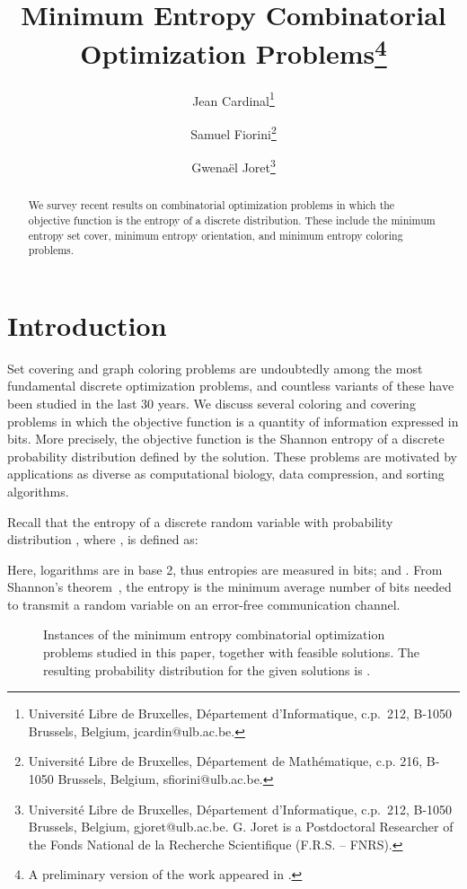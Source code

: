 \documentclass[10pt,a4paper]{article}
\title{Minimum Entropy Combinatorial Optimization Problems\footnote{
A preliminary version of the work appeared in \cite{CiE}.
}}
\author{
Jean Cardinal\thanks{Universit\'e Libre de Bruxelles, D\'epartement d'Informatique, c.p.~212, B-1050 Brussels, Belgium, jcardin@ulb.ac.be.}
 \and 
Samuel Fiorini\thanks{Universit\'e Libre de Bruxelles, D\'epartement de Math\'ematique, c.p. 216,  B-1050 Brussels, Belgium,  sfiorini@ulb.ac.be.}
\and 
Gwena\"el Joret\thanks{Universit\'e Libre de Bruxelles, D\'epartement d'Informatique, c.p.~212,  B-1050 Brussels, Belgium, gjoret@ulb.ac.be. G. Joret is a Postdoctoral Researcher of the Fonds National de la Recherche Scientifique (F.R.S. -- FNRS).}
}
\date{}
\begin{document}
\maketitle
\sloppy

\begin{abstract}
We survey recent results on combinatorial optimization problems in which the objective function is the entropy of a discrete distribution.
These include the minimum entropy set cover, minimum entropy orientation, and minimum entropy coloring problems. 
\end{abstract}

\section{Introduction}

Set covering and graph coloring problems are undoubtedly among the most fundamental discrete optimization problems, and countless variants of these have been studied in the last 30 years. We discuss several coloring and covering problems in which the objective function is a quantity of information expressed in bits. More precisely, the objective function is the Shannon entropy of a discrete probability distribution defined by the solution. These problems are motivated by applications as diverse as computational biology, data compression, and sorting algorithms.\medskip

Recall that the entropy of a discrete random variable  with probability distribution , where , is defined as:

Here, logarithms are in base 2, thus entropies are measured in bits; and . From Shannon's theorem~\cite{Shanno48}, the entropy is the minimum average number of bits needed to transmit a random variable on an error-free communication channel.\medskip

\begin{figure}[t]
\begin{center}
 \hspace{1cm} 
 \hspace{1cm}
 \hspace{1cm}
\end{center}
\caption{\label{fig:ex}Instances of the minimum entropy combinatorial optimization problems studied in this paper, together
with feasible solutions. The resulting probability distribution for the given solutions is .}
\end{figure}
\end{document}
